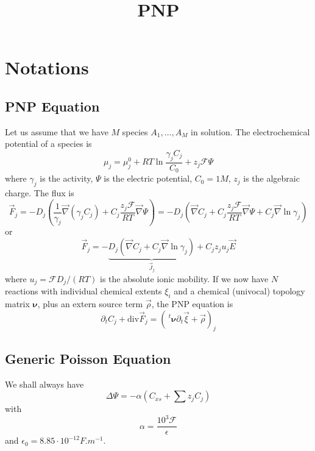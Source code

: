 \documentclass{revtex4}
\newcommand{\trn}{\!\!~^t}
\begin{document}
	\title{PNP}
	\maketitle
	
\section{Notations}
\subsection{PNP Equation}
Let us assume that we have $M$ species $A_1,\ldots,A_M$ in solution.
The electrochemical potential of a species is
\begin{equation}
	\mu_j = \mu^{0}_j + RT \ln \dfrac{\gamma_jC_j}{C_0} + z_j\mathcal{F}\Psi
\end{equation}
where $\gamma_j$ is the activity, $\Psi$ is the electric potential, $C_0=1M$, $z_j$ is the algebraic charge.
The flux is
\begin{equation}
	\vec{F}_j = -D_j 
	\left( 
		\dfrac{1}{\gamma_j} \vec{\nabla} \left( \gamma_j C_j \right) + 
		C_j \dfrac{z_j\mathcal{F}}{RT} \vec{\nabla}\Psi 
	\right)
	=
	 -D_j 
	\left( 
		\vec{\nabla}  C_j  + 
		C_j \dfrac{z_j\mathcal{F}}{RT} \vec{\nabla}\Psi + C_j \vec{\nabla} \ln \gamma_j
	\right)
\end{equation}
or
\begin{equation}
	\vec{F}_j = - \underbrace{D_j\left( \vec{\nabla} C_j + C_j \vec{\nabla} \ln \gamma_j \right)}_{\vec{J}_j} + C_j z_j u_j \vec{E}
\end{equation}
where $u_j = \mathcal{F}D_j/(RT)$ is the absolute ionic mobility.
If we now have $N$ reactions with individual chemical extents $\xi_i$ and
a chemical (univocal) topology matrix $\pmb{\nu}$, plus an extern source term $\vec{\rho}$, the PNP equation is
\begin{equation}
	\partial_t C_j + \mathrm{div}\vec{F}_j = \left(\trn\pmb{\nu} \partial_t \vec{\xi} + \vec{\rho}\right)_j
\end{equation}

\subsection{Generic Poisson Equation}
We shall always have
\begin{equation}
	\Delta \Psi = - \alpha \left(C_{xs}+\sum z_j C_j\right)
\end{equation}
with
$$
	\alpha = \dfrac{10^3\mathcal{F}}{\epsilon}
$$
and $\epsilon_0=8.85\cdot 10^{-12} F.m^{-1}$.
\end{document}
